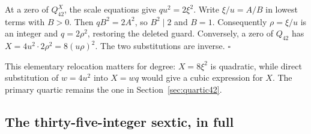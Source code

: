 At a zero of $Q_{42}^{X}$, the scale equations give
$qu^2=2\xi^2$. Write $\xi/u=A/B$ in lowest terms with $B>0$.
Then $qB^2=2A^2$, so $B^2\mid2$ and $B=1$. Consequently
$\rho=\xi/u$ is an integer and $q=2\rho^2$, restoring the deleted
guard. Conversely, a zero of $Q_{42}$ has
$X=4u^2\cdot2\rho^2=8(u\rho)^2$. The two substitutions are inverse.
\hfill$\square$

This elementary relocation matters for degree: $X=8\xi^2$ is quadratic,
while direct substitution of $w=4u^2$ into $X=wq$ would give a cubic
expression for $X$. The primary quartic remains the one in
Section~\ref{sec:quartic42}.

\subsection{The thirty-five-integer sextic, in full}

